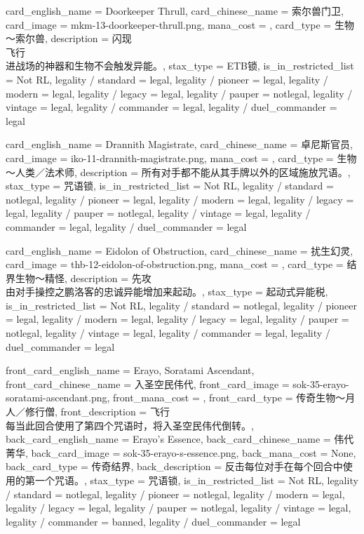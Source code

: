 \documentclass[lang = cn, color = black, 10pt]{AllThatStax}
\begin{document}
\card
{
	card_english_name = {Doorkeeper Thrull},
	card_chinese_name = {索尔兽门卫},
	card_image = mkm-13-doorkeeper-thrull.png,
	mana_cost = ,
	card_type = 生物～索尔兽,
	description = {闪现\\
飞行\\
进战场的神器和生物不会触发异能。},
	stax_type = ETB锁,
	is_in_restricted_list = Not RL,
	legality / standard = legal,
	legality / pioneer = legal,
	legality / modern = legal,
	legality / legacy = legal,
	legality / pauper = notlegal,
	legality / vintage = legal,
	legality / commander = legal,
	legality / duel_commander = legal
}

\card
{
	card_english_name = {Drannith Magistrate},
	card_chinese_name = {卓尼斯官员},
	card_image = iko-11-drannith-magistrate.png,
	mana_cost = ,
	card_type = 生物～人类／法术师,
	description = {所有对手都不能从其手牌以外的区域施放咒语。},
	stax_type = 咒语锁,
	is_in_restricted_list = Not RL,
	legality / standard = notlegal,
	legality / pioneer = legal,
	legality / modern = legal,
	legality / legacy = legal,
	legality / pauper = notlegal,
	legality / vintage = legal,
	legality / commander = legal,
	legality / duel_commander = legal
}

\card
{
	card_english_name = {Eidolon of Obstruction},
	card_chinese_name = {扰生幻灵},
	card_image = thb-12-eidolon-of-obstruction.png,
	mana_cost = ,
	card_type = 结界生物～精怪,
	description = {先攻\\
由对手操控之鹏洛客的忠诚异能增加来起动。},
	stax_type = 起动式异能税,
	is_in_restricted_list = Not RL,
	legality / standard = notlegal,
	legality / pioneer = legal,
	legality / modern = legal,
	legality / legacy = legal,
	legality / pauper = notlegal,
	legality / vintage = legal,
	legality / commander = legal,
	legality / duel_commander = legal
}

\mfcard
{
	front_card_english_name = {Erayo, Soratami Ascendant},
	front_card_chinese_name = {入圣空民伟代},
	front_card_image = sok-35-erayo-soratami-ascendant.png,
	front_mana_cost = ,
	front_card_type = 传奇生物～月人／修行僧,
	front_description = {飞行\\
每当此回合使用了第四个咒语时，将入圣空民伟代倒转。},
	back_card_english_name = {Erayo's Essence},
	back_card_chinese_name = {伟代菁华},
	back_card_image = sok-35-erayo-s-essence.png,
	back_mana_cost = None,
	back_card_type = 传奇结界,
	back_description = {反击每位对手在每个回合中使用的第一个咒语。},
	stax_type = 咒语锁,
	is_in_restricted_list = Not RL,
	legality / standard = notlegal,
	legality / pioneer = notlegal,
	legality / modern = legal,
	legality / legacy = legal,
	legality / pauper = notlegal,
	legality / vintage = legal,
	legality / commander = banned,
	legality / duel_commander = legal
}
\end{document}
